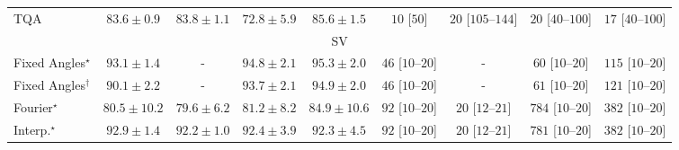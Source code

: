 \begin{tabular}{l|cccc|cccc|}
TQA & {\cellcolor[HTML]{4AB062}} \color[HTML]{F1F1F1} $83.6\pm 0.9$ & {\cellcolor[HTML]{47AE60}} \color[HTML]{F1F1F1} $83.8\pm 1.1$ & {\cellcolor[HTML]{DDF1A6}} \color[HTML]{000000} $72.8\pm 5.9$ & {\cellcolor[HTML]{369D54}} \color[HTML]{F1F1F1} $85.6\pm 1.5$ & {\cellcolor[HTML]{FFF6F2}} \color[HTML]{000000} $10$ [$50$] & {\cellcolor[HTML]{FFF3F0}} \color[HTML]{000000} $20$ [$105$--$144$] & {\cellcolor[HTML]{FFF3F0}} \color[HTML]{000000} $20$ [$40$--$100$] & {\cellcolor[HTML]{FFF4F0}} \color[HTML]{000000} $17$ [$40$--$100$] \\
\cline{1-9}
\multicolumn{9}{c}{\rule{0pt}{8pt}SV} \\
\midrule
Fixed Angles$^\star$ & {\cellcolor[HTML]{034C78}} \color[HTML]{F1F1F1} $93.1\pm 1.4$ & {\cellcolor[HTML]{000000}} \color[HTML]{F1F1F1} {\cellcolor{white}} \color{black} - & {\cellcolor[HTML]{023C5F}} \color[HTML]{F1F1F1} $94.8\pm 2.1$ & {\cellcolor[HTML]{023858}} \color[HTML]{F1F1F1} $95.3\pm 2.0$ & {\cellcolor[HTML]{FEEDE9}} \color[HTML]{000000} $46$ [$10$--$20$] & {\cellcolor[HTML]{000000}} \color[HTML]{F1F1F1} {\cellcolor{white}} \color{black} - & {\cellcolor[HTML]{FEEAE7}} \color[HTML]{000000} $60$ [$10$--$20$] & {\cellcolor[HTML]{FDDDD9}} \color[HTML]{000000} $115$ [$10$--$20$] \\
Fixed Angles$^\dagger$ & {\cellcolor[HTML]{04639B}} \color[HTML]{F1F1F1} $90.1\pm 2.2$ & {\cellcolor[HTML]{000000}} \color[HTML]{F1F1F1} {\cellcolor{white}} \color{black} - & {\cellcolor[HTML]{03466E}} \color[HTML]{F1F1F1} $93.7\pm 2.1$ & {\cellcolor[HTML]{023B5D}} \color[HTML]{F1F1F1} $94.9\pm 2.0$ & {\cellcolor[HTML]{FEEDE9}} \color[HTML]{000000} $46$ [$10$--$20$] & {\cellcolor[HTML]{000000}} \color[HTML]{F1F1F1} {\cellcolor{white}} \color{black} - & {\cellcolor[HTML]{FEE9E6}} \color[HTML]{000000} $61$ [$10$--$20$] & {\cellcolor[HTML]{FDDBD7}} \color[HTML]{000000} $121$ [$10$--$20$] \\
Fourier$^\star$ & {\cellcolor[HTML]{75A9CF}} \color[HTML]{F1F1F1} $80.5\pm 10.2$ & {\cellcolor[HTML]{81AED2}} \color[HTML]{F1F1F1} $79.6\pm 6.2$ & {\cellcolor[HTML]{69A5CC}} \color[HTML]{F1F1F1} $81.2\pm 8.2$ & {\cellcolor[HTML]{2D8ABD}} \color[HTML]{F1F1F1} $84.9\pm 10.6$ & {\cellcolor[HTML]{FDE2DF}} \color[HTML]{000000} $92$ [$10$--$20$] & {\cellcolor[HTML]{FFF3F0}} \color[HTML]{000000} $20$ [$12$--$21$] & {\cellcolor[HTML]{49006A}} \color[HTML]{F1F1F1} $784$ [$10$--$20$] & {\cellcolor[HTML]{F76EA3}} \color[HTML]{F1F1F1} $382$ [$10$--$20$] \\
Interp.$^\star$ & {\cellcolor[HTML]{034D79}} \color[HTML]{F1F1F1} $92.9\pm 1.4$ & {\cellcolor[HTML]{045483}} \color[HTML]{F1F1F1} $92.2\pm 1.0$ & {\cellcolor[HTML]{045382}} \color[HTML]{F1F1F1} $92.4\pm 3.9$ & {\cellcolor[HTML]{045483}} \color[HTML]{F1F1F1} $92.3\pm 4.5$ & {\cellcolor[HTML]{FDE2DF}} \color[HTML]{000000} $92$ [$10$--$20$] & {\cellcolor[HTML]{FFF3F0}} \color[HTML]{000000} $20$ [$12$--$21$] & {\cellcolor[HTML]{49006A}} \color[HTML]{F1F1F1} $781$ [$10$--$20$] & {\cellcolor[HTML]{F76EA3}} \color[HTML]{F1F1F1} $382$ [$10$--$20$] \\

\end{tabular}

